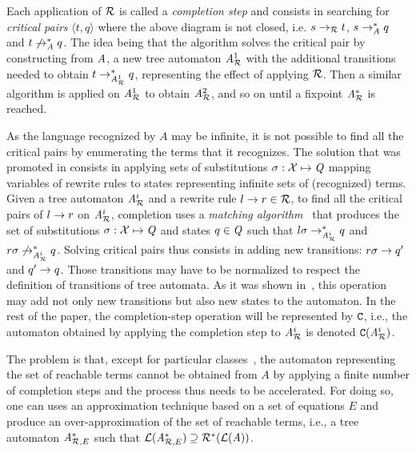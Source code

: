 Each application of $\mathcal R$ is called a {\em completion step} and
consists in searching for {\em critical pairs} $\langle t,q \rangle$ where the above
diagram is not closed, i.e. $ s\rightarrow_\mathcal R t$, $s \rightarrow_{\mathit A}^* q$ and $t
\not\rightarrow_{\mathit A}^* q$.
The idea being that the algorithm solves the critical pair by
constructing from $\mathit A$, a new tree automaton ${\it A}_{\mathcal R}^1$ with the
additional transitions needed to obtain $t \rightarrow_{{\it A}_{\mathcal R}^1}^* q$,
representing the effect of applying $\mathcal R$. Then a similar algorithm is
applied on ${\it A}_{\mathcal R}^1$ to obtain ${\it A}_{\mathcal R}^2$, and so on until a fixpoint
${\it A}_{\mathcal R}^*$ is reached.

As the language recognized by $A$ may be infinite, it is not possible to find
all the critical pairs by enumerating the terms that it recognizes. The solution
that was promoted in \cite{Genet-RTA98} consists in applying sets of
substitutions $\sigma: \mathcal X \mapsto \mathit Q$ mapping variables of rewrite rules to
states representing infinite sets of (recognized) terms. Given a tree automaton
${\it A}_{\mathcal R}^i$ and a rewrite rule $l \rightarrow r \in \mathcal R$, to find all the critical pairs of
$l \rightarrow r$ on ${\it A}_{\mathcal R}^i$, completion uses a {\em matching
  algorithm}~\cite{FeuilladeGVTT-JAR04} that produces the set of substitutions
$\sigma: \mathcal X \mapsto \mathit Q$ and states $q\in \mathit Q$ such that $l \sigma \rightarrow_{{\it A}_{\mathcal R}^i}^*
q$ and $r\sigma \not\rightarrow_{{\it A}_{\mathcal R}^i}^* q$. Solving critical pairs thus consists in
adding new transitions: $r\sigma \rightarrow q'$ and $q' \rightarrow q$. Those transitions may
have to be normalized to respect the definition of transitions of tree
automata. As it was shown in~\cite{Genet-RTA98}, this operation may add not only
new transitions but also new states to the automaton. In the rest of the paper,
the completion-step operation will be represented by $\mathtt{C}$, i.e., the
automaton obtained by applying the completion step to ${\it A}_{\mathcal R}^i$ is denoted
$\mathtt{C}({\it A}_{\mathcal R}^i)$.

The problem is that, except for particular
classes~\cite{FeuilladeGVTT-JAR04,Genet-Habil}, the automaton
representing the set of reachable terms cannot be obtained from $A$ by
applying a finite number of completion steps and the process thus
needs to be accelerated. For doing so, one can uses an approximation
technique based on a set of equations $E$ and produce an
over-approximation of the set of reachable terms, i.e., a tree
automaton $\mathit A^*_{\mathcal R,E}$ such that $\mathcal{L}(\mathit A^*_{\mathcal R,E}) \supseteq
\mathcal R^*(\mathcal{L}(\mathit A))$.


